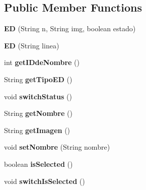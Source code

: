 \subsection*{Public Member Functions}
\begin{DoxyCompactItemize}
\item 
\mbox{\label{classmodelo_1_1_e_d_ad95b8183b75d33d1e69555041e595262}} 
{\bfseries ED} (String n, String img, boolean estado)
\item 
\mbox{\label{classmodelo_1_1_e_d_a4a78274dca0082f34ea7c03bb8b34bdd}} 
{\bfseries ED} (String linea)
\item 
\mbox{\label{classmodelo_1_1_e_d_a3a831edc54f3b1d9451ad9358e18c63b}} 
int {\bfseries get\+I\+Dde\+Nombre} ()
\item 
\mbox{\label{classmodelo_1_1_e_d_a5544596d88811fba6207e688d862d675}} 
String {\bfseries get\+Tipo\+ED} ()
\item 
\mbox{\label{classmodelo_1_1_e_d_a56fdd989da6d3ae993efbd8732dea073}} 
void {\bfseries switch\+Status} ()
\item 
\mbox{\label{classmodelo_1_1_e_d_a4ff6ff8bd69e9d8a18cc93c544648ea7}} 
String {\bfseries get\+Nombre} ()
\item 
\mbox{\label{classmodelo_1_1_e_d_a88e344ca2fceda1e27d2d7c373dc0b61}} 
String {\bfseries get\+Imagen} ()
\item 
\mbox{\label{classmodelo_1_1_e_d_a5650f97fda341ffe61c2a5f86865540e}} 
void {\bfseries set\+Nombre} (String nombre)
\item 
\mbox{\label{classmodelo_1_1_e_d_a69fdfb590fdb2bca589aace8c760922d}} 
boolean {\bfseries is\+Selected} ()
\item 
\mbox{\label{classmodelo_1_1_e_d_af5f19608ff75e1e2598720d53f78d020}} 
void {\bfseries switch\+Is\+Selected} ()
\item 
\mbox{\label{classmodelo_1_1_e_d_a0c76a786c73a3f35dda3126adcb96c67}} 

\end{DoxyCompactItemize}
